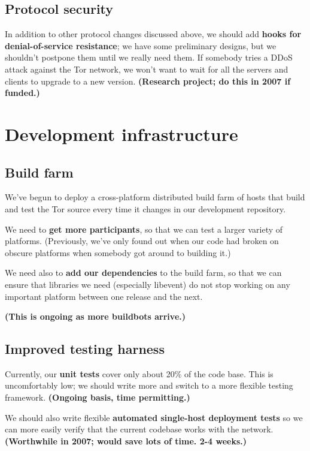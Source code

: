 \documentclass{article}
\newcommand{\plan}[1]{ {\bf (#1)}}
\begin{document}
\subsection{Protocol security}

In addition to other protocol changes discussed above,
we should add {\bf hooks for denial-of-service resistance}; we have some
preliminary designs, but we shouldn't postpone them until we really need them.
If somebody tries a DDoS attack against the Tor network, we won't want to
wait for all the servers and clients to upgrade to a new
version.\plan{Research project; do this in 2007 if funded.}

\section{Development infrastructure}

\subsection{Build farm}
We've begun to deploy a cross-platform distributed build farm of hosts
that build and test the Tor source every time it changes in our development
repository.

We need to {\bf get more participants}, so that we can test a larger variety
of platforms.  (Previously, we've only found out when our code had broken on
obscure platforms when somebody got around to building it.)

We need also to {\bf add our dependencies} to the build farm, so that we can
ensure that libraries we need (especially libevent) do not stop working on
any important platform between one release and the next.

\plan{This is ongoing as more buildbots arrive.}

\subsection{Improved testing harness}
Currently, our {\bf unit tests} cover only about 20\% of the code base.  This
is uncomfortably low; we should write more and switch to a more flexible
testing framework.\plan{Ongoing basis, time permitting.}

We should also write flexible {\bf automated single-host deployment tests} so
we can more easily verify that the current codebase works with the
network.\plan{Worthwhile in 2007; would save lots of time.  2-4 weeks.}
\end{document}
